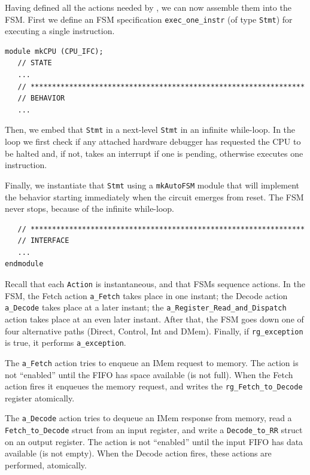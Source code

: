 Having defined all the actions needed by {\DRUM}, we can now assemble
them into the {\DRUM} FSM.  First we define an FSM specification
\verb|exec_one_instr| (of type \verb|Stmt|) for executing a single
instruction.

{\footnotesize
\begin{Verbatim}
module mkCPU (CPU_IFC);
   // STATE
   ...
   // ****************************************************************
   // BEHAVIOR
   ...
\end{Verbatim}
}


Then, we embed that \verb|Stmt| in a next-level \verb|Stmt| in an
infinite while-loop.  In the loop we first check if any attached
hardware debugger has requested the CPU to be halted and, if not,
takes an interrupt if one is pending, otherwise executes one
instruction.

Finally, we instantiate that \verb|Stmt| using a \verb|mkAutoFSM|
module that will implement the behavior starting immediately when the
circuit emerges from reset.  The FSM never stops, because of the
infinite while-loop.


{\footnotesize
\begin{Verbatim}
   // ****************************************************************
   // INTERFACE
   ...
endmodule
\end{Verbatim}
}

Recall that each \verb|Action| is instantaneous, and that FSMs
sequence actions.  In the FSM, the Fetch action \verb|a_Fetch| takes
place in one instant; the Decode action \verb|a_Decode| takes place at
a later instant; the \verb|a_Register_Read_and_Dispatch| action takes
place at an even later instant.  After that, the FSM goes down one of
four alternative paths (Direct, Control, Int and DMem).  Finally, if
\verb|rg_exception| is true, it performs \verb|a_exception|.

The \verb|a_Fetch| action tries to enqueue an IMem request to memory.
The action is not ``enabled'' until the FIFO has space available (is
not full).  When the Fetch action fires it enqueues the memory
request, and writes the \verb|rg_Fetch_to_Decode| register atomically.

The \verb|a_Decode| action tries to dequeue an IMem response from
memory, read a \verb|Fetch_to_Decode| struct from an input register,
and write a \verb|Decode_to_RR| struct on an output register.  The
action is not ``enabled'' until the input FIFO has data available (is
not empty).  When the Decode action fires, these actions are
performed, atomically.

